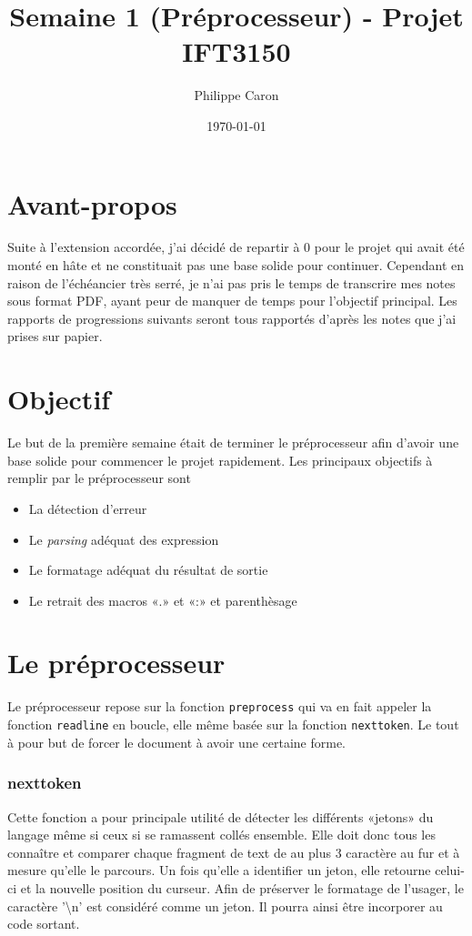 \documentclass{article}
\title{Semaine 1 (Préprocesseur) - Projet IFT3150}
\date{\today}
\author{Philippe Caron}
\begin{document}
\maketitle
\section{Avant-propos}
Suite à l'extension accordée, j'ai décidé de repartir à 0 pour le projet qui avait été monté en hâte et ne constituait pas une base solide pour continuer. Cependant en raison de l'échéancier très serré, je n'ai pas pris le temps de transcrire mes notes sous format PDF, ayant peur de manquer de temps pour l'objectif principal. Les rapports de progressions suivants seront tous rapportés d'après les notes que j'ai prises sur papier.

\section{Objectif}
Le but de la première semaine était de terminer le préprocesseur afin d'avoir une base solide pour commencer le projet rapidement. Les principaux objectifs à remplir par le préprocesseur sont
\begin{itemize}
\item La détection d'erreur
\item Le \textit{parsing} adéquat des expression
\item Le formatage adéquat du résultat de sortie
\item Le retrait des macros «.» et «:» et parenthèsage
\end{itemize}

\section{Le préprocesseur}
Le préprocesseur repose sur la fonction \texttt{preprocess} qui va en fait appeler la fonction \texttt{readline} en boucle, elle même basée sur la fonction \texttt{nexttoken}. Le tout à pour but de forcer le document à avoir une certaine forme.

\subsubsection{nexttoken}
Cette fonction a pour principale utilité de détecter les différents «jetons» du langage même si ceux si se ramassent collés ensemble. Elle doit donc tous les connaître et comparer chaque fragment de text de au plus 3 caractère au fur et à mesure qu'elle le parcours. Un fois qu'elle a identifier un jeton, elle retourne celui-ci et la nouvelle position du curseur. Afin de préserver le formatage de l'usager, le caractère '\textbackslash{}n' est considéré comme un jeton. Il pourra ainsi être incorporer au code sortant.
\end{document}
